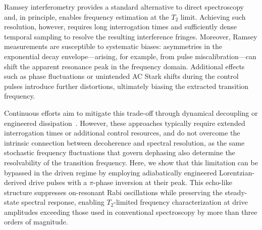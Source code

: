 Ramsey interferometry provides a standard alternative to direct spectroscopy and, in principle, enables frequency estimation at the $T_2$ limit. Achieving such resolution, however, requires long interrogation times and sufficiently dense temporal sampling to resolve the resulting interference fringes. Moreover, Ramsey measurements are susceptible to systematic biases: asymmetries in the exponential decay envelope—arising, for example, from pulse miscalibration—can shift the apparent resonance peak in the frequency domain. Additional effects such as phase fluctuations or unintended AC Stark shifts during the control pulses introduce further distortions, ultimately biasing the extracted transition frequency.

Continuous efforts aim to mitigate this trade-off through dynamical decoupling or engineered dissipation~\cite{PhysRevLett.122.060503,retzker_2,Cao_2025}. However, these approaches typically require extended interrogation times or additional control resources, and do not overcome the intrinsic connection between decoherence and spectral resolution, as the same stochastic frequency fluctuations that govern dephasing also determine the resolvability of the transition frequency. Here, we show that this limitation can be bypassed in the driven regime by employing adiabatically engineered Lorentzian-derived drive pulses with a $\pi$-phase inversion at their peak. This echo-like structure suppresses on-resonant Rabi oscillations while preserving the steady-state spectral response, enabling $T_2$-limited frequency characterization at drive amplitudes exceeding those used in conventional spectroscopy by more than three orders of magnitude.






